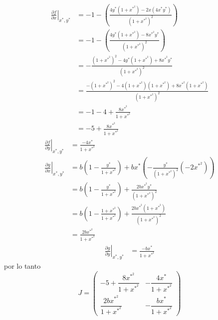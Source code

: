 \begin{align*}
  \left. \frac{\partial f}{\partial x}  \right|_{x^*,y^*} &= -1 - \left( \frac{4y^*(1+x^{{*}^2})-2x(4x^*y^*)}{(1+x^{{*}^2})^2} \right) \\ 
                                                          &= -1- \left( \frac{4y^*(1+x^{{*}^2})-8x^{{*}^2}y^*}{(1+x^{{*}^2})^2} \right) \\
                                                          &= - \frac{(1+x^{{*}^2})^2-4y^*(1+x^{{*}^2})+8x^{{*}^2}y^*}{(1+x^{{*}^2})^2} \\
                                                          &= \frac{-(1+x^{{*}^2})^2-4(1+x^{{*}^2})(1+x^{{*}^2})+8x^{{*}^2}(1+x^{{*}^2})}{(1+x^{{*}^2})^2} \\
                                                          &= -1 - 4 + \frac{8x^{{*}^2}}{1+x^{{*}^2}} \\
                                                          &= -5 + \frac{8x^{{*}^2}}{1+x^{{*}^2}}
\end{align*}
\begin{align*}
  \left. \frac{\partial f}{\partial y}  \right|_{x^*,y^*} &= \frac{-4x^*}{1+x^{{*}^2}} \\
    \left. \frac{\partial g}{\partial x}  \right|_{x^*,y^*} &= b \left( 1 - \frac{y^*}{1+x^{{*}^2}} \right) + bx^* \left( - \frac{y^*}{(1+x^{{*}^2})^2}(-2x^{{*}^2}) \right) \\
                                                            &= b \left( 1 - \frac{y^*}{1+x^{{*}^2}} \right)+ \frac{2bx^{{*}^2}y^*}{(1+x^{{*}^2})^2} \\
                                                            &= b \left( 1 - \frac{1+x^{{*}^2}}{1+x^{{*}^2}} \right) + \frac{2bx^{{*}^2}(1+x^{{*}^2})}{(1+x^{{*}^2})^2} \\
                                                            &= \frac{2bx^{{*}^2}}{1+x^{{*}^2}}
\end{align*}
\begin{align*}
  \left. \frac{\partial g}{\partial y}  \right|_{x^*,y^*} & = \frac{-bx^*}{1+x^{{*}^2}}  
\end{align*}
por lo tanto
\begin{equation*}
  J = \begin{pmatrix} -5 + \dfrac{8x^{{*}^2}}{1+x^{{*}^2}} &  -\dfrac{4x^*}{1+x^{{*}^2}} \\ \dfrac{2bx^{{*}^2}}{1+x^{{*}^2}} & -\dfrac{bx^*}{1+x^{{*}^2}} \end{pmatrix}  
\end{equation*}
